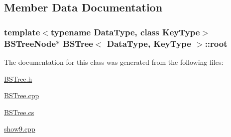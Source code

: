\subsection{Member Data Documentation}
\hypertarget{class_b_s_tree_a83534afce9094181ac031f9f596a8625}{
\subsubsection[{root}]{\setlength{\rightskip}{0pt plus 5cm}template$<$typename Data\+Type, class Key\+Type$>$ {\bf B\+S\+Tree\+Node}$\ast$ {\bf B\+S\+Tree}$<$ Data\+Type, Key\+Type $>$\+::root\hspace{0.3cm}{\ttfamily [protected]}}}\label{class_b_s_tree_a83534afce9094181ac031f9f596a8625}


The documentation for this class was generated from the following files\+:\begin{DoxyCompactItemize}
\item 
\hyperlink{_b_s_tree_8h}{B\+S\+Tree.\+h}\item 
\hyperlink{_b_s_tree_8cpp}{B\+S\+Tree.\+cpp}\item 
\hyperlink{_b_s_tree_8cs}{B\+S\+Tree.\+cs}\item 
\hyperlink{show9_8cpp}{show9.\+cpp}\end{DoxyCompactItemize}
